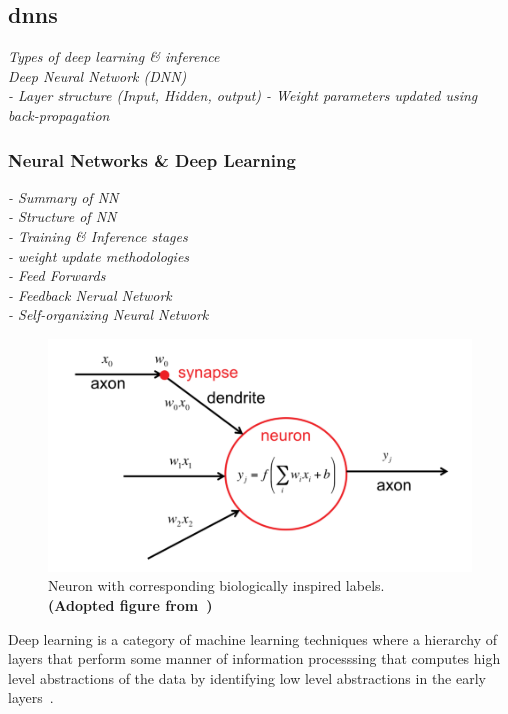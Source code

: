 \documentclass[11pt]{article}
\begin{document}
\subsection{\Acrlong*{dnn}s}\label{subsec:deepLearning}
\emph{
Types of deep learning \& inference\\
Deep Neural Network (DNN)\\
 - Layer structure (Input, Hidden, output)
 - Weight parameters updated using back-propagation
}

\subsubsection{Neural Networks \& Deep Learning}
\emph{
    - Summary of NN\\
    - Structure of NN\\
    - Training \& Inference stages\\
    - weight update methodologies\\
    - Feed Forwards\\
    - Feedback Nerual Network\\
    - Self-organizing Neural Network\\
}
\begin{figure}
    \includegraphics[width=1\textwidth]{Perceptron_efficient_proc.png}
    \caption{Neuron with corresponding biologically inspired labels.\\ \textbf{(Adopted figure from~\autocite{szeEfficientProcessingDeep2017})}}
    \label{fig:neuronLabeled}
\end{figure}
Deep learning is a category of machine learning techniques where a hierarchy of layers that perform some manner of information processsing that computes high level abstractions of the data by identifying low level abstractions in the early layers~\autocite{dengTutorialSurveyArchitectures2014}.
\end{document}

